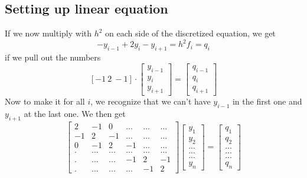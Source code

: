 \documentclass{article}
\begin{document}
\subsection{Setting up linear equation}
If we now multiply with $h^2$ on each side of the discretized equation, we get
$$-y_{i-1} + 2y_i - y_{i+1} = h^2f_i = q_i$$
if we pull out the numbers
\[
[-1\ 2\ -1] \cdot
\begin{bmatrix}
y_{i-1} \\
y_i \\
y_{i+1}
\end{bmatrix}
=
\begin{bmatrix}
q_{i-1} \\
q_{i} \\
q_{i+1}
\end{bmatrix}
\]
Now to make it for all $i$, we recognize that we can't have $y_{i-1}$ in the first one and $y_{i+1}$ at the last one. We then get
\[
\begin{bmatrix}
2 & -1 & 0 & ... & ... & ... \\
-1 & 2 & -1 & ... & ... & ... \\
0 & -1 & 2 & -1 & ... & ... \\
. & ... & ... & ... & ... & ... \\
. & ... & ... & -1 & 2 & -1 \\
. & ... & ... & ... & -1 & 2
\end{bmatrix}
\begin{bmatrix}
y_1 \\
y_2 \\
... \\
... \\
... \\
y_n
\end{bmatrix}
=
\begin{bmatrix}
q_1 \\
q_2 \\
... \\
... \\
... \\
q_n
\end{bmatrix}
\]
\end{document}
